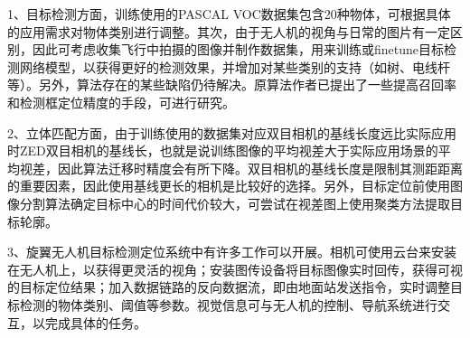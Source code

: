 1、目标检测方面，训练使用的PASCAL VOC数据集包含20种物体，可根据具体的应用需求对物体类别进行调整。其次，由于无人机的视角与日常的图片有一定区别，因此可考虑收集飞行中拍摄的图像并制作数据集，用来训练或finetune目标检测网络模型，以获得更好的检测效果，并增加对某些类别的支持（如树、电线杆等）。另外，算法存在的某些缺陷仍待解决。原算法作者已提出了一些提高召回率和检测框定位精度的手段，可进行研究。

2、立体匹配方面，由于训练使用的数据集对应双目相机的基线长度远比实际应用时ZED双目相机的基线长，也就是说训练图像的平均视差大于实际应用场景的平均视差，因此算法迁移时精度会有所下降。双目相机的基线长度是限制其测距距离的重要因素，因此使用基线更长的相机是比较好的选择。另外，目标定位前使用图像分割算法确定目标中心的时间代价较大，可尝试在视差图上使用聚类方法提取目标轮廓。

3、旋翼无人机目标检测定位系统中有许多工作可以开展。相机可使用云台来安装在无人机上，以获得更灵活的视角；安装图传设备将目标图像实时回传，获得可视的目标定位结果；加入数据链路的反向数据流，即由地面站发送指令，实时调整目标检测的物体类别、阈值等参数。视觉信息可与无人机的控制、导航系统进行交互，以完成具体的任务。





